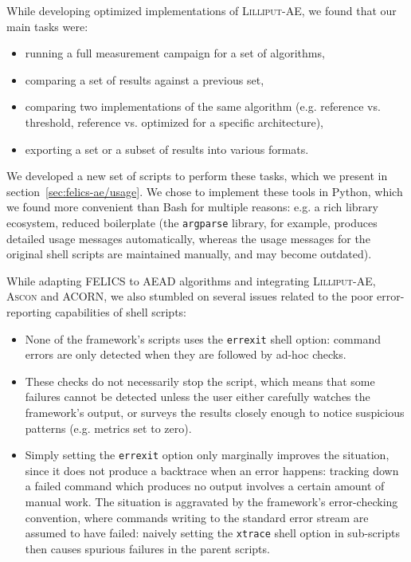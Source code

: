 \documentclass{article}
\begin{document}
While developing optimized implementations of \textsc{Lilliput-AE}, we
found that our main tasks were:

\begin{itemize}
\item running a full measurement campaign for a set of algorithms,
\item comparing a set of results against a previous set,
\item comparing two implementations of the same algorithm
  (e.g. reference vs. threshold, reference vs. optimized for a
  specific architecture),
\item exporting a set or a subset of results into various formats.
\end{itemize}

We developed a new set of scripts to perform these tasks, which we
present in section~\ref{sec:felics-ae/usage}.  We chose to implement
these tools in Python, which we found more convenient than Bash for
multiple reasons: e.g. a rich library ecosystem, reduced boilerplate
(the \texttt{argparse} library, for example, produces detailed usage
messages automatically, whereas the usage messages for the original
shell scripts are maintained manually, and may become outdated).

While adapting FELICS to AEAD algorithms and integrating
\textsc{Lilliput-AE}, \textsc{Ascon} and ACORN, we also stumbled on
several issues related to the poor error-reporting capabilities of
shell scripts:

\begin{itemize}
\item None of the framework's scripts uses the \texttt{errexit} shell
  option: command errors are only detected when they are followed by
  ad-hoc checks.
\item These checks do not necessarily stop the script, which means
  that some failures cannot be detected unless the user either
  carefully watches the framework's output, or surveys the results
  closely enough to notice suspicious patterns (e.g. metrics set to
  zero).
\item Simply setting the \texttt{errexit} option only marginally
  improves the situation, since it does not produce a backtrace when
  an error happens: tracking down a failed command which produces no
  output involves a certain amount of manual work.  The situation is
  aggravated by the framework's error-checking convention, where
  commands writing to the standard error stream are assumed to have
  failed: naively setting the \texttt{xtrace} shell option in
  sub-scripts then causes spurious failures in the parent scripts.
\end{itemize}
\end{document}
